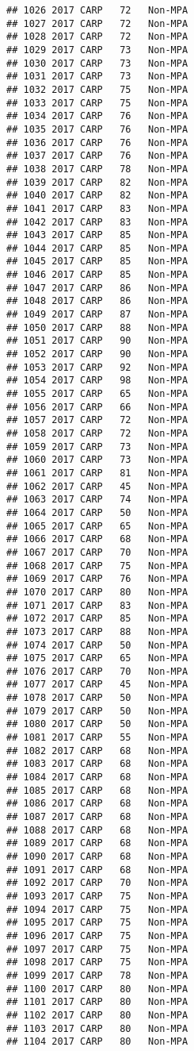 \documentclass[]{article}
\begin{document}
\begin{verbatim}
## 1026 2017 CARP   72   Non-MPA
## 1027 2017 CARP   72   Non-MPA
## 1028 2017 CARP   72   Non-MPA
## 1029 2017 CARP   73   Non-MPA
## 1030 2017 CARP   73   Non-MPA
## 1031 2017 CARP   73   Non-MPA
## 1032 2017 CARP   75   Non-MPA
## 1033 2017 CARP   75   Non-MPA
## 1034 2017 CARP   76   Non-MPA
## 1035 2017 CARP   76   Non-MPA
## 1036 2017 CARP   76   Non-MPA
## 1037 2017 CARP   76   Non-MPA
## 1038 2017 CARP   78   Non-MPA
## 1039 2017 CARP   82   Non-MPA
## 1040 2017 CARP   82   Non-MPA
## 1041 2017 CARP   83   Non-MPA
## 1042 2017 CARP   83   Non-MPA
## 1043 2017 CARP   85   Non-MPA
## 1044 2017 CARP   85   Non-MPA
## 1045 2017 CARP   85   Non-MPA
## 1046 2017 CARP   85   Non-MPA
## 1047 2017 CARP   86   Non-MPA
## 1048 2017 CARP   86   Non-MPA
## 1049 2017 CARP   87   Non-MPA
## 1050 2017 CARP   88   Non-MPA
## 1051 2017 CARP   90   Non-MPA
## 1052 2017 CARP   90   Non-MPA
## 1053 2017 CARP   92   Non-MPA
## 1054 2017 CARP   98   Non-MPA
## 1055 2017 CARP   65   Non-MPA
## 1056 2017 CARP   66   Non-MPA
## 1057 2017 CARP   72   Non-MPA
## 1058 2017 CARP   72   Non-MPA
## 1059 2017 CARP   73   Non-MPA
## 1060 2017 CARP   73   Non-MPA
## 1061 2017 CARP   81   Non-MPA
## 1062 2017 CARP   45   Non-MPA
## 1063 2017 CARP   74   Non-MPA
## 1064 2017 CARP   50   Non-MPA
## 1065 2017 CARP   65   Non-MPA
## 1066 2017 CARP   68   Non-MPA
## 1067 2017 CARP   70   Non-MPA
## 1068 2017 CARP   75   Non-MPA
## 1069 2017 CARP   76   Non-MPA
## 1070 2017 CARP   80   Non-MPA
## 1071 2017 CARP   83   Non-MPA
## 1072 2017 CARP   85   Non-MPA
## 1073 2017 CARP   88   Non-MPA
## 1074 2017 CARP   50   Non-MPA
## 1075 2017 CARP   65   Non-MPA
## 1076 2017 CARP   70   Non-MPA
## 1077 2017 CARP   45   Non-MPA
## 1078 2017 CARP   50   Non-MPA
## 1079 2017 CARP   50   Non-MPA
## 1080 2017 CARP   50   Non-MPA
## 1081 2017 CARP   55   Non-MPA
## 1082 2017 CARP   68   Non-MPA
## 1083 2017 CARP   68   Non-MPA
## 1084 2017 CARP   68   Non-MPA
## 1085 2017 CARP   68   Non-MPA
## 1086 2017 CARP   68   Non-MPA
## 1087 2017 CARP   68   Non-MPA
## 1088 2017 CARP   68   Non-MPA
## 1089 2017 CARP   68   Non-MPA
## 1090 2017 CARP   68   Non-MPA
## 1091 2017 CARP   68   Non-MPA
## 1092 2017 CARP   70   Non-MPA
## 1093 2017 CARP   75   Non-MPA
## 1094 2017 CARP   75   Non-MPA
## 1095 2017 CARP   75   Non-MPA
## 1096 2017 CARP   75   Non-MPA
## 1097 2017 CARP   75   Non-MPA
## 1098 2017 CARP   75   Non-MPA
## 1099 2017 CARP   78   Non-MPA
## 1100 2017 CARP   80   Non-MPA
## 1101 2017 CARP   80   Non-MPA
## 1102 2017 CARP   80   Non-MPA
## 1103 2017 CARP   80   Non-MPA
## 1104 2017 CARP   80   Non-MPA

\end{verbatim}
\end{document}
